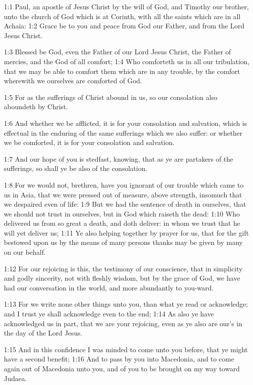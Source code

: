 

1:1 Paul, an apostle of Jesus Christ by the will of God, and Timothy our brother, unto the church of God which is at Corinth, with all the saints which are in all Achaia: 1:2 Grace be to you and peace from God our Father, and from the Lord Jesus Christ.

1:3 Blessed be God, even the Father of our Lord Jesus Christ, the Father of mercies, and the God of all comfort; 1:4 Who comforteth us in all our tribulation, that we may be able to comfort them which are in any trouble, by the comfort wherewith we ourselves are comforted of God.

1:5 For as the sufferings of Christ abound in us, so our consolation also aboundeth by Christ.

1:6 And whether we be afflicted, it is for your consolation and salvation, which is effectual in the enduring of the same sufferings which we also suffer: or whether we be comforted, it is for your consolation and salvation.

1:7 And our hope of you is stedfast, knowing, that as ye are partakers of the sufferings, so shall ye be also of the consolation.

1:8 For we would not, brethren, have you ignorant of our trouble which came to us in Asia, that we were pressed out of measure, above strength, insomuch that we despaired even of life: 1:9 But we had the sentence of death in ourselves, that we should not trust in ourselves, but in God which raiseth the dead: 1:10 Who delivered us from so great a death, and doth deliver: in whom we trust that he will yet deliver us; 1:11 Ye also helping together by prayer for us, that for the gift bestowed upon us by the means of many persons thanks may be given by many on our behalf.

1:12 For our rejoicing is this, the testimony of our conscience, that in simplicity and godly sincerity, not with fleshly wisdom, but by the grace of God, we have had our conversation in the world, and more abundantly to you-ward.

1:13 For we write none other things unto you, than what ye read or acknowledge; and I trust ye shall acknowledge even to the end; 1:14 As also ye have acknowledged us in part, that we are your rejoicing, even as ye also are our's in the day of the Lord Jesus.

1:15 And in this confidence I was minded to come unto you before, that ye might have a second benefit; 1:16 And to pass by you into Macedonia, and to come again out of Macedonia unto you, and of you to be brought on my way toward Judaea.

